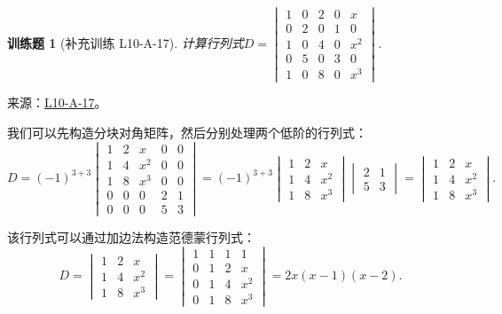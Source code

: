 \documentclass[UTF8,12pt,a4paper,fontset=fandol]{ctexart}
\newtheorem{exercise}{训练题}[section]
\begin{document}
\begin{exercise}[补充训练 L10-A-17]\label{prob:L10-A-17}
计算行列式$D=\begin{vmatrix}
                1 & 0 & 2 & 0 & x   \\
                0 & 2 & 0 & 1 & 0   \\
                1 & 0 & 4 & 0 & x^2 \\
                0 & 5 & 0 & 3 & 0   \\
                1 & 0 & 8 & 0 & x^3
            \end{vmatrix}$.
\end{exercise}
\noindent 来源：\href{https://github.com/yhwu-is/Linear-Algebra-Left-Undone/blob/new/%E8%AE%B2%E4%B9%89/%E4%B8%93%E9%A2%98/10%20%E8%A1%8C%E5%88%97%E5%BC%8F.tex}{L10-A-17}。
\begin{solve}
我们可以先构造分块对角矩阵，然后分别处理两个低阶的行列式：
            \[
                D = (-1)^{3+3} \begin{vmatrix}
                    1 & 2 & x   & 0 & 0 \\
                    1 & 4 & x^2 & 0 & 0 \\
                    1 & 8 & x^3 & 0 & 0 \\
                    0 & 0 & 0   & 2 & 1 \\
                    0 & 0 & 0   & 5 & 3
                \end{vmatrix} = (-1)^{3+3} \begin{vmatrix}
                    1 & 2 & x   \\
                    1 & 4 & x^2 \\
                    1 & 8 & x^3
                \end{vmatrix} \begin{vmatrix}
                    2 & 1 \\
                    5 & 3
                \end{vmatrix} = \begin{vmatrix}
                    1 & 2 & x   \\
                    1 & 4 & x^2 \\
                    1 & 8 & x^3
                \end{vmatrix}.
            \]

            该行列式可以通过加边法构造范德蒙行列式：
            \[
                D = \begin{vmatrix}
                    1 & 2 & x   \\
                    1 & 4 & x^2 \\
                    1 & 8 & x^3
                \end{vmatrix} = \begin{vmatrix}
                    1 & 1 & 1 & 1   \\
                    0 & 1 & 2 & x   \\
                    0 & 1 & 4 & x^2 \\
                    0 & 1 & 8 & x^3
                \end{vmatrix} = 2x(x-1)(x-2).
            \]
\end{solve}
\end{document}
